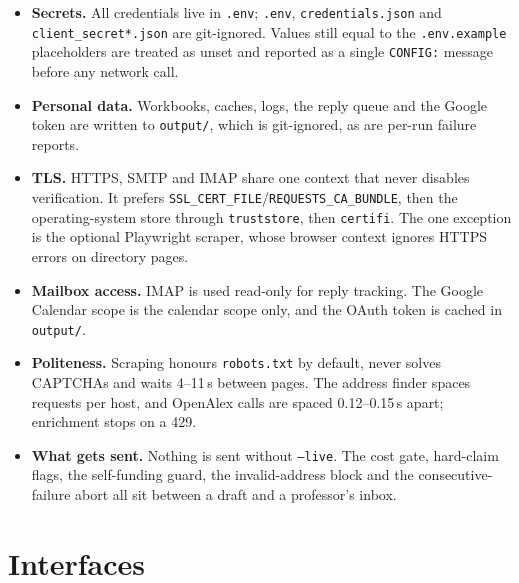 \documentclass[11pt,a4paper]{article}
\newcommand{\code}[1]{\texttt{#1}}
\begin{document}
\begin{itemize}
  \item \textbf{Secrets.} All credentials live in \code{.env}; \code{.env},
        \code{credentials.json} and \code{client\_secret*.json} are git-ignored. Values still
        equal to the \code{.env.example} placeholders are treated as unset and reported as a
        single \code{CONFIG:} message before any network call.
  \item \textbf{Personal data.} Workbooks, caches, logs, the reply queue and the Google token
        are written to \code{output/}, which is git-ignored, as are per-run failure reports.
  \item \textbf{TLS.} HTTPS, SMTP and IMAP share one context that never disables verification. It
        prefers \code{SSL\_CERT\_FILE}/\code{REQUESTS\_CA\_BUNDLE}, then the operating-system
        store through \code{truststore}, then \code{certifi}. The one exception is the optional
        Playwright scraper, whose browser context ignores HTTPS errors on directory pages.
  \item \textbf{Mailbox access.} IMAP is used read-only for reply tracking. The Google Calendar
        scope is the calendar scope only, and the OAuth token is cached in \code{output/}.
  \item \textbf{Politeness.} Scraping honours \code{robots.txt} by default, never solves
        CAPTCHAs and waits 4--11\,s between pages. The address finder spaces requests per host,
        and OpenAlex calls are spaced 0.12--0.15\,s apart; enrichment stops on a 429.
  \item \textbf{What gets sent.} Nothing is sent without \code{--live}. The cost gate, hard-claim
        flags, the self-funding guard, the invalid-address block and the consecutive-failure
        abort all sit between a draft and a professor's inbox.
\end{itemize}

\section{Interfaces}
\end{document}
